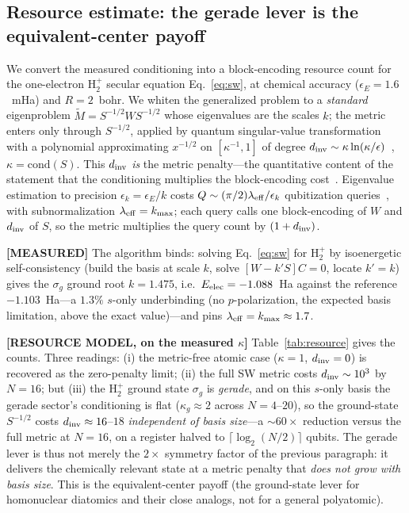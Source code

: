\documentclass[aps,pra,twocolumn,superscriptaddress,longbibliography]{revtex4-2}
\begin{document}
\subsection{Resource estimate: the gerade lever is the equivalent-center payoff}
\label{sec:resource}

We convert the measured conditioning into a block-encoding resource count for the
one-electron $\mathrm{H}_2^+$ secular equation Eq.~\eqref{eq:sw}, at chemical accuracy
($\epsilon_E=1.6$~mHa) and $R=2$~bohr.  We whiten the generalized problem to a
\emph{standard} eigenproblem $\tilde M=S^{-1/2}WS^{-1/2}$ whose eigenvalues are the scales
$k$; the metric enters only through $S^{-1/2}$, applied by quantum
singular-value transformation with a polynomial approximating $x^{-1/2}$ on $[\kappa^{-1},1]$
of degree $d_{\rm inv}\sim\kappa\ln(\kappa/\epsilon)$~\cite{gslw2019,cks2017},
$\kappa=\mathrm{cond}(S)$.  This $d_{\rm inv}$ \emph{is} the metric penalty---the quantitative
content of the statement that the conditioning multiplies the block-encoding
cost~\cite{gslw2019,cks2017}.
Eigenvalue estimation to precision $\epsilon_k=\epsilon_E/k$ costs
$Q\sim(\pi/2)\lambda_{\rm eff}/\epsilon_k$ qubitization queries~\cite{lowchuang2019}, with
subnormalization $\lambda_{\rm eff}=k_{\max}$; each query calls one block-encoding of $W$ and
$d_{\rm inv}$ of $S$, so the metric multiplies the query count by $(1+d_{\rm inv})$.

\textbf{[MEASURED]} The algorithm binds: solving Eq.~\eqref{eq:sw} for $\mathrm{H}_2^+$ by
isoenergetic self-consistency (build the basis at scale $k$, solve $[W-k'S]C=0$, locate
$k'=k$) gives the $\sigma_g$ ground root $k=1.475$, i.e.\ $E_{\rm elec}=-1.088$~Ha against the
reference $-1.103$~Ha---a $1.3\%$ $s$-only underbinding (no $p$-polarization, the expected
basis limitation, above the exact value)---and pins $\lambda_{\rm eff}=k_{\max}\approx1.7$.

\textbf{[RESOURCE MODEL, on the measured $\kappa$]} Table~\ref{tab:resource} gives the counts.
Three readings: (i) the metric-free atomic case ($\kappa=1$, $d_{\rm inv}=0$) is recovered as
the zero-penalty limit; (ii) the full SW metric costs $d_{\rm inv}\sim10^3$ by $N=16$; but
(iii) the $\mathrm{H}_2^+$ ground state $\sigma_g$ is \emph{gerade}, and on this $s$-only basis the gerade sector's
conditioning is flat ($\kappa_g\approx2$ across $N=4$--$20$), so the ground-state $S^{-1/2}$
costs $d_{\rm inv}\approx16$--$18$ \emph{independent of basis size}---a ${\sim}60\times$
reduction versus the full metric at $N=16$, on a register halved to
$\lceil\log_2(N/2)\rceil$ qubits.  The gerade lever is thus not merely the $2\times$ symmetry
factor of the previous paragraph: it delivers the chemically relevant state at a metric penalty
that \emph{does not grow with basis size}.  This is the equivalent-center payoff (the ground-state lever for homonuclear diatomics and their close analogs, not for a general polyatomic).
\end{document}
